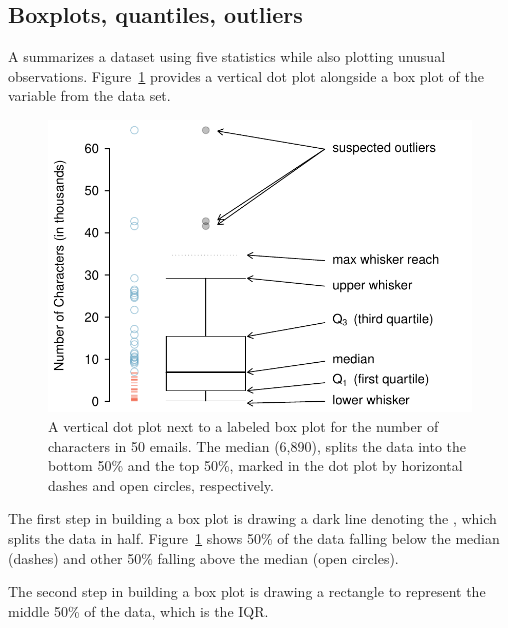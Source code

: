 \begin{doublespace}
\subsection{Boxplots, quantiles, outliers}

A  summarizes a dataset using five statistics while also plotting unusual observations. Figure~\ref{boxPlotLayoutNumVar} provides a vertical dot plot alongside a box plot of the  variable from the  data set.

\begin{figure}[h]
	\centering
	\includegraphics[width=0.86\mycaptionwidth]{ch_intro_to_data_oi_biostat/figures/boxPlotLayoutNumVar/boxPlotLayoutNumVar}
	\caption{A vertical dot plot next to a labeled box plot for the number of characters in 50 emails. The median (6,890), splits the data into the bottom 50\% and the top 50\%, marked in the dot plot by horizontal dashes and open circles, respectively.}
	\label{boxPlotLayoutNumVar}
\end{figure}

The first step in building a box plot is drawing a dark line denoting the , which splits the data in half. Figure~\ref{boxPlotLayoutNumVar} shows 50\% of the data falling below the median (dashes) and other 50\% falling above the median (open circles). 

The second step in building a box plot is drawing a rectangle to represent the middle 50\% of the data, which is the IQR.

\end{doublespace}
